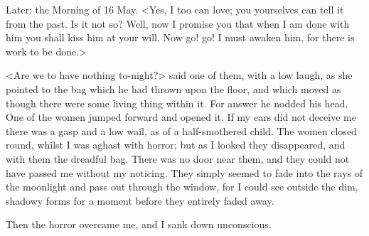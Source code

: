 \begin{diary}{Later: the Morning of 16 May.}
<Yes, I too can love; you yourselves can tell it from the past. Is it not so? Well, now I promise you that when I am done with him you shall kiss him at your will. Now go! go! I must awaken him, for there is work to be done.>

<Are we to have nothing to-night?> said one of them, with a low laugh, as she pointed to the bag which he had thrown upon the floor, and which moved as though there were some living thing within it. For answer he nodded his head. One of the women jumped forward and opened it. If my ears did not deceive me there was a gasp and a low wail, as of a half-smothered child. The women closed round, whilst I was aghast with horror; but as I looked they disappeared, and with them the dreadful bag. There was no door near them, and they could not have passed me without my noticing. They simply seemed to fade into the rays of the moonlight and pass out through the window, for I could see outside the dim, shadowy forms for a moment before they entirely faded away.

Then the horror overcame me, and I sank down unconscious.
\end{diary}